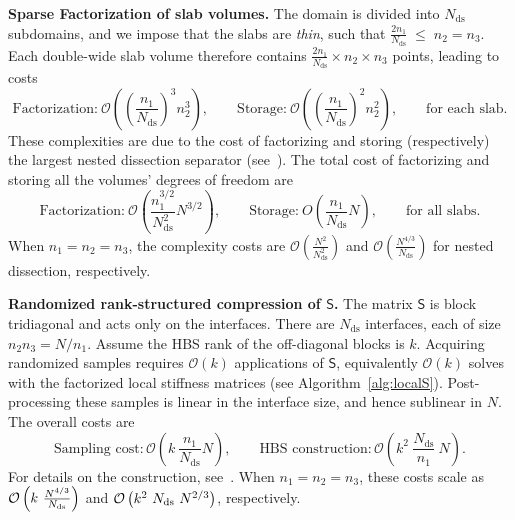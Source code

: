 \documentclass[final,onefignum,onetabnum]{siamart250211}
\newcommand{\mtx}[1]{\bm{\mathsf{#1}}}
\theoremstyle{definition}
\begin{document}
\noindent \textbf{Sparse Factorization of slab volumes.}
The domain is divided into $N_{\text{ds}}$ subdomains, and we impose that the slabs are \textit{thin}, such that
$\frac{2n_1}{N_{\text{ds}}} \;\leq\; n_2= n_3$.
Each double-wide slab volume therefore contains $\tfrac{2n_1}{N_{\text{ds}}} \times n_2 \times n_3$ points, leading to costs
$$\text{Factorization:}\ \mathcal O\left( \left(\frac {n_1}{N_{\text{ds}}}\right)^3 n_2^3 \right), \qquad \text{Storage:}\ \mathcal O\left( \left(\frac {n_1}{N_{\text{ds}}}\right)^2 n_2^2 \right), \qquad \text{for each slab}.$$
These complexities are due to the cost of factorizing and storing (respectively) the largest nested dissection separator (see~\cite[Ch.~20]{2019_martinsson_fast_direct_solvers}).
The total cost of factorizing and storing all the volumes' degrees of freedom are
$$\text{Factorization:}\ \mathcal O\left( \frac {n_1^{3/2}}{N_{\text{ds}}^2} N^{3/2}\right), \qquad \text{Storage:}\ O\left( \frac {n_1}{N_{\text{ds}}} N\right), \qquad \text{for all slabs}.$$
When $n_1 = n_2 = n_3$, the complexity costs are
$\mathcal{O}\!\left(\tfrac{N^2}{N_{\text{ds}}^2}\right)$ and
$\mathcal{O}\!\left(\tfrac{N^{4/3}}{N_{\text{ds}}}\right)$
for nested dissection, respectively.

\vspace{0.5em}

\noindent \textbf{Randomized rank-structured compression of $\mtx S$.}
The matrix $\mtx{S}$ is block tridiagonal and acts only on the interfaces.
There are $N_{\text{ds}}$ interfaces, each of size $n_2 n_3=N/ n_1$.
Assume the HBS rank of the off-diagonal blocks is $k$.
Acquiring randomized samples requires $\mathcal{O}(k)$ applications of $\mtx{S}$,
equivalently $\mathcal{O}(k)$ solves with the factorized local stiffness matrices
(see Algorithm~\ref{alg:localS}).
Post-processing these samples is linear in the interface size, and hence sublinear in $N$.
The overall costs are
$$\text{Sampling cost}: \mathcal O\left( k\ \frac {n_1}{N_{\text{ds}}} N\right), \qquad \text{HBS construction}: \mathcal O\left(k^2\ \frac {N_{\text{ds}}}{n_1}\  N\right).$$
For details on the construction, see~\cite{fastHBS}. When $n_1 = n_2 = n_3$, these costs scale as $\mathcal O\left(k\ \frac{N^{4/3}}{N_{\rm ds}}\right)$ and $\mathcal O\left(k^2\ N_{\rm ds}\ N^{2/3}\right)$, respectively.

\vspace{0.5em}
\end{document}
